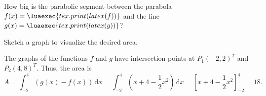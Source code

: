\documentclass[answers, a4paper, 10pt]{exam}
\begin{document}
\begin{questions}

\question[k]
How big is the parabolic segment between the parabola $f(x)=\luaexec{tex.print(latex(f))}$ and the line $g(x)=\luaexec{tex.print(latex(g))}$?

Sketch a graph to visualize the desired area.
\begin{solution}
The graphs of the functions $f$ and $g$ have intersection points at $P_1(-2,2)^T$ and $P_2(4,8)^T$.
Thus, the area is
\begin{equation*}
    A=\int_{-2}^{4}(g(x)-f(x))\,\mathrm{d}x=\int_{-2}^{4}\left(x+4-\frac{1}{2}x^2\right)\,\mathrm{d}x=\left[x+4-\frac{1}{2}x^2\right]_{-2}^{4}=18.
\end{equation*}
%
\begin{center}
\end{center}
\end{solution}

\end{questions}
\end{document}
